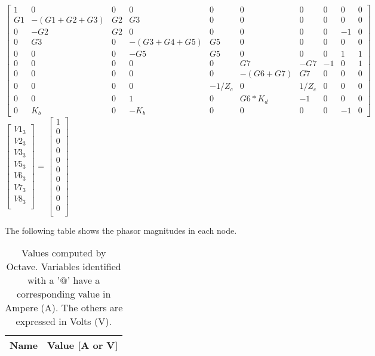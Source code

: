 {\footnotesize
$ \begin{bmatrix}
1 & 0 & 0 & 0 & 0 & 0 & 0 & 0 & 0 & 0 \\
G1 & -(G1+G2+G3) & G2 & G3 & 0 & 0 & 0 & 0 & 0 & 0 \\
0 & -G2 & G2 & 0 & 0 & 0 & 0 & 0 & -1 & 0 \\
0 & G3 & 0 & -(G3+G4+G5) & G5 & 0 & 0 & 0 & 0 & 0 \\
0 & 0 & 0 & -G5 & G5 & 0 & 0 & 0 & 1 & 1 \\
0 & 0 & 0 & 0 & 0 & G7 & -G7 & -1 & 0 & 1 \\
0 & 0 & 0 & 0 & 0 & -(G6+G7) & G7 & 0 & 0 & 0 \\
0 & 0 & 0 & 0 & -1/Z_c & 0 & 1/Z_c & 0 & 0 & 0 \\
0 & 0 & 0 & 1 & 0 & G6*K_d & -1 & 0 & 0 & 0 \\
0 & K_b & 0 & -K_b & 0 & 0 & 0 & 0 & -1 & 0 
\end{bmatrix}  $
$ \begin{bmatrix}
V1_3 \\
V2_3 \\
V3_3 \\
V5_3 \\
V6_3 \\
V7_3 \\
V8_3 \\
\end{bmatrix}  $
=
$ \begin{bmatrix}
1 \\
0 \\
0 \\
0 \\
0 \\
0 \\
0 \\
0 \\
0 \\
0 \\
\end{bmatrix}  $

}

The following table shows the phasor magnitudes in each node.

\begin{table}[ht]
	\centering
	\begin{tabular}{|l|r|}
    		\hline    
    		{\bf Name} & {\bf Value [A or V]} \\ \hline
    		
  	\end{tabular}
  	\caption{Values computed by Octave. Variables identified with a '$@$' have a
  	corresponding value in Ampere (A). The others are expressed in Volts (V).}
 
\label{tab:node}
\end{table}


